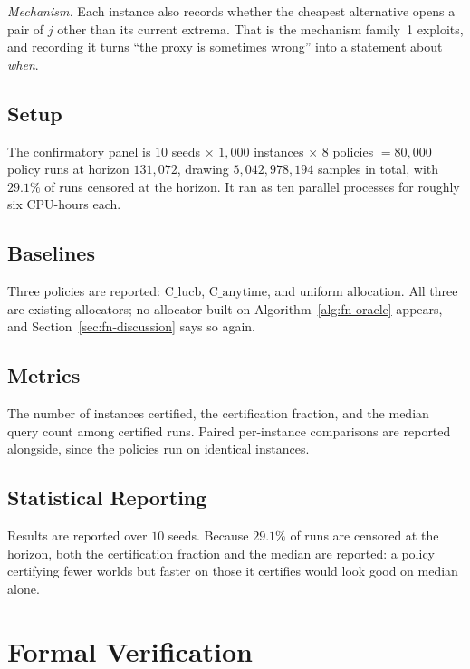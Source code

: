 \emph{Mechanism.} Each instance also records whether the cheapest alternative opens a pair of
$j$ other than its current extrema. That is the mechanism family~1 exploits, and recording it
turns ``the proxy is sometimes wrong'' into a statement about \emph{when}.

\subsection{Setup}

The confirmatory panel is $10$ seeds $\times$ $1{,}000$ instances $\times$ $8$ policies
$=80{,}000$ policy runs at horizon $131{,}072$, drawing $5{,}042{,}978{,}194$ samples in
total, with $29.1\%$ of runs censored at the horizon. It ran as ten parallel processes for
roughly six CPU-hours each.

\subsection{Baselines}

Three policies are reported: $\mathrm{C\_lucb}$, $\mathrm{C\_anytime}$, and uniform
allocation. All three are existing allocators; no allocator built on
Algorithm~\ref{alg:fn-oracle} appears, and Section~\ref{sec:fn-discussion} says so again.

\subsection{Metrics}

The number of instances certified, the certification fraction, and the median query count
among certified runs. Paired per-instance comparisons are reported alongside, since the
policies run on identical instances.

\subsection{Statistical Reporting}

Results are reported over $10$ seeds. Because $29.1\%$ of runs are censored at the horizon,
both the certification fraction and the median are reported: a policy certifying fewer worlds
but faster on those it certifies would look good on median alone.


\section{Formal Verification}

